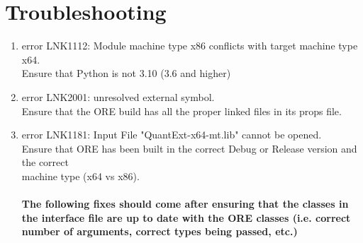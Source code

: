 \documentclass[10pt]{article}
\begin{document}
\section*{Troubleshooting}
\begin{enumerate}
    \item error LNK1112: Module machine type x86 conflicts with target machine type x64.\\
    \-\hspace{1cm}  Ensure that Python is not 3.10 (3.6 and higher)\\
    
    \item error LNK2001: unresolved external symbol. \\
    \-\hspace{1cm}  Ensure that the ORE build has all the proper linked files in its props file.\\
    
    \item error LNK1181: Input File "QuantExt-x64-mt.lib" cannot be opened. \\
    \-\hspace{1cm}  Ensure that ORE has been built in the correct Debug or Release version and the correct \\\-\hspace{1cm} machine type (x64 vs x86).\\
    \\
    
    \textbf{The following fixes should come after ensuring that the classes in the interface file are up to date with the ORE classes (i.e. correct number of arguments, correct types being passed, etc.)} \\
    

\end{enumerate}
\end{document}
